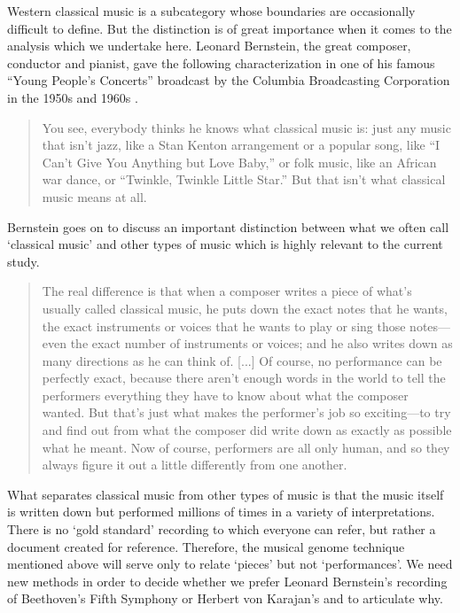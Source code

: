 \documentclass[12pt]{article}
\begin{document}
Western classical music is a subcategory
whose boundaries are occasionally difficult to define. But
the distinction is of great importance when it comes to the analysis
which we undertake here. Leonard Bernstein, the great composer,
conductor and pianist, gave the following characterization in one of his famous
``Young People's Concerts''
broadcast by the Columbia Broadcasting Corporation in the 1950s and
1960s \citep{Bernstein2005}.
\begin{quote}
  You see, everybody thinks he knows what classical music is: just any music that isn't jazz,
  like a Stan Kenton arrangement or a popular song, like ``I Can't Give
  You Anything but Love Baby,'' or folk music, like an African war
  dance, or ``Twinkle, Twinkle Little Star.'' But that isn't what
  classical music means at all.
\end{quote}
Bernstein goes on to discuss an important distinction between what
we often call `classical music' and other types of music which is
highly relevant to the current study.
\begin{quote}
  The real difference is that when a composer
  writes a piece of what's usually called classical music, he puts down
  the exact notes that he wants, the exact instruments or voices that he
  wants to play or sing those notes---even the exact number of
  instruments or voices; and he also writes down as many directions as
  he can think of. [...] Of course, no performance can be perfectly exact, because there
  aren't enough words in the world to tell the performers everything
  they have to know about what the composer wanted. But that's just what
  makes the performer's job so exciting---to try and find out from what
  the composer did write down as exactly as possible what he meant. Now
  of course, performers are all only human, and so they always figure it
  out a little differently from one another.  
\end{quote}
What separates classical music from other types of music is that the
music itself is written down but performed millions of times in a
variety of interpretations. There is no `gold standard' recording to
which everyone can refer, but rather a document created for
reference. Therefore, the musical genome technique mentioned above
will serve only to relate `pieces' but not `performances'. We need
new methods in order to decide whether we prefer Leonard Bernstein's
recording of Beethoven's Fifth Symphony or Herbert von Karajan's and
to articulate why.
\end{document}
